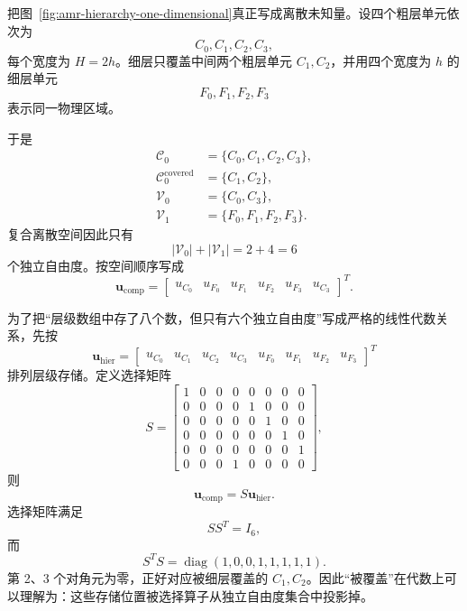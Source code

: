 把图~\ref{fig:amr-hierarchy-one-dimensional}真正写成离散未知量。设四个粗层单元依次为
\begin{equation}
C_0,C_1,C_2,C_3,
\end{equation}
每个宽度为 $H=2h$。细层只覆盖中间两个粗层单元 $C_1,C_2$，并用四个宽度为 $h$ 的细层单元
\begin{equation}
F_0,F_1,F_2,F_3
\end{equation}
表示同一物理区域。

于是
\begin{align}
\mathcal C_0
&=\{C_0,C_1,C_2,C_3\},\\
\mathcal C_0^{\mathrm{covered}}
&=\{C_1,C_2\},\\
\mathcal V_0
&=\{C_0,C_3\},\\
\mathcal V_1
&=\{F_0,F_1,F_2,F_3\}.
\end{align}
复合离散空间因此只有
\begin{equation}
|\mathcal V_0|+|\mathcal V_1|=2+4=6
\end{equation}
个独立自由度。按空间顺序写成
\begin{equation}
\boxed{
\bm u_{\mathrm{comp}}
=
\begin{bmatrix}
u_{C_0}&
u_{F_0}&
u_{F_1}&
u_{F_2}&
u_{F_3}&
u_{C_3}
\end{bmatrix}^{T}.
}
\label{eq:amr-minimal-composite-vector}
\end{equation}

为了把“层级数组中存了八个数，但只有六个独立自由度”写成严格的线性代数关系，先按
\begin{equation}
\bm u_{\mathrm{hier}}
=
\begin{bmatrix}
u_{C_0}&u_{C_1}&u_{C_2}&u_{C_3}&
u_{F_0}&u_{F_1}&u_{F_2}&u_{F_3}
\end{bmatrix}^{T}
\label{eq:amr-minimal-hierarchy-vector}
\end{equation}
排列层级存储。定义选择矩阵
\begin{equation}
S=
\begin{bmatrix}
1&0&0&0&0&0&0&0\\
0&0&0&0&1&0&0&0\\
0&0&0&0&0&1&0&0\\
0&0&0&0&0&0&1&0\\
0&0&0&0&0&0&0&1\\
0&0&0&1&0&0&0&0
\end{bmatrix},
\end{equation}
则
\begin{equation}
\boxed{
\bm u_{\mathrm{comp}}
=
S\bm u_{\mathrm{hier}}.
}
\label{eq:amr-storage-to-composite}
\end{equation}
选择矩阵满足
\begin{equation}
SS^T=I_6,
\label{eq:amr-selection-left-identity}
\end{equation}
而
\begin{equation}
S^TS
=
\operatorname{diag}(1,0,0,1,1,1,1,1).
\label{eq:amr-selection-mask}
\end{equation}
第 2、3 个对角元为零，正好对应被细层覆盖的 $C_1,C_2$。因此“被覆盖”在代数上可以理解为：这些存储位置被选择算子从独立自由度集合中投影掉。

